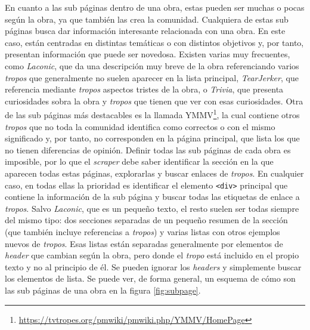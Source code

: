 En cuanto a las sub páginas dentro de una obra, estas pueden ser muchas o pocas
según la obra, ya que también las crea la comunidad. Cualquiera de estas sub
páginas busca dar información interesante relacionada con una obra. En este
caso, están centradas en distintas temáticas o con distintos objetivos y, por
tanto, presentan información que puede ser novedosa. Existen varias muy
frecuentes, como \textit{Laconic}, que da una descripción muy breve de la obra
referenciando varios \textit{tropos} que generalmente no suelen aparecer en la
lista principal, \textit{TearJerker}, que referencia mediante \textit{tropos}
aspectos tristes de la obra, o \textit{Trivia}, que presenta curiosidades sobra
la obra y \textit{tropos} que tienen que ver con esas curiosidades. Otra de las
sub páginas más destacables es la llamada
YMMV\footnote{\url{https://tvtropes.org/pmwiki/pmwiki.php/YMMV/HomePage}}, la
cual contiene otros \textit{tropos} que no toda la comunidad identifica como
correctos o con el mismo significado y, por tanto, no corresponden en la página
principal, que lista los que no tienen diferencias de opinión. Definir todas las
sub páginas de cada obra es imposible, por lo que el \textit{scraper} debe saber
identificar la sección en la que aparecen todas estas páginas, explorarlas y
buscar enlaces de \textit{tropos}. En cualquier caso, en todas ellas la
prioridad es identificar el elemento \texttt{<div>} principal que contiene la
información de la sub página y buscar todas las etiquetas de enlace a
\textit{tropos}. Salvo \textit{Laconic}, que es un pequeño texto, el resto
suelen ser todas siempre del mismo tipo: dos secciones separadas de un pequeño
resumen de la sección (que también incluye referencias a \textit{tropos}) y
varias listas con otros ejemplos nuevos de \textit{tropos}. Esas listas están
separadas generalmente por elementos de \textit{header} que cambian según la
obra, pero donde el \textit{tropo} está incluido en el propio texto y no al
principio de él. Se pueden ignorar los \textit{headers} y simplemente buscar los
elementos de lista. Se puede ver, de forma general, un esquema de cómo son las
sub páginas de una obra en la figura \ref{fig:subpage}.

